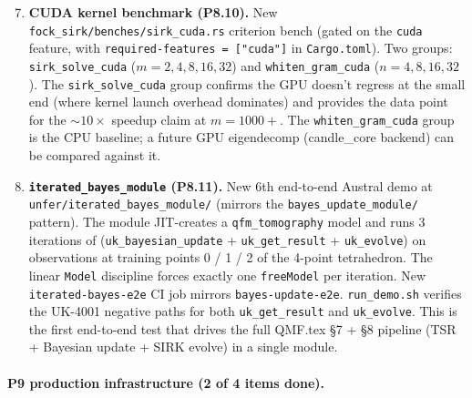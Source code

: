 \documentclass[11pt, a4paper]{article}
\begin{document}
\begin{enumerate}
\setcounter{enumi}{6}
\item \textbf{CUDA kernel benchmark (P8.10).} New
  \texttt{fock\_sirk/benches/sirk\_cuda.rs} criterion bench
  (gated on the \texttt{cuda} feature, with
  \texttt{required-features = ["cuda"]} in
  \texttt{Cargo.toml}). Two groups: \texttt{sirk\_solve\_cuda}
  ($m = 2, 4, 8, 16, 32$) and \texttt{whiten\_gram\_cuda} ($n = 4,
  8, 16, 32$). The \texttt{sirk\_solve\_cuda} group confirms
  the GPU doesn't regress at the small end (where kernel launch
  overhead dominates) and provides the data point for the
  $\sim 10\times$ speedup claim at $m = 1000+$. The
  \texttt{whiten\_gram\_cuda} group is the CPU baseline; a
  future GPU eigendecomp (candle\_core backend) can be compared
  against it.

\item \textbf{\texttt{iterated\_bayes\_module} (P8.11).} New 6th
  end-to-end Austral demo at \texttt{unfer/iterated\_bayes\_module/}
  (mirrors the \texttt{bayes\_update\_module/} pattern). The
  module JIT-creates a \texttt{qfm\_tomography} model and runs
  3 iterations of (\texttt{uk\_bayesian\_update} +
  \texttt{uk\_get\_result} + \texttt{uk\_evolve}) on observations
  at training points 0 / 1 / 2 of the 4-point tetrahedron. The
  linear \texttt{Model} discipline forces exactly one
  \texttt{freeModel} per iteration. New
  \texttt{iterated-bayes-e2e} CI job mirrors
  \texttt{bayes-update-e2e}. \texttt{run\_demo.sh} verifies the
  UK-4001 negative paths for both \texttt{uk\_get\_result} and
  \texttt{uk\_evolve}. This is the first end-to-end test that
  drives the full QMF.tex \S7 + \S8 pipeline (TSR + Bayesian
  update + SIRK evolve) in a single module.
\end{enumerate}

\paragraph{P9 production infrastructure (2 of 4 items done).}
\end{document}
